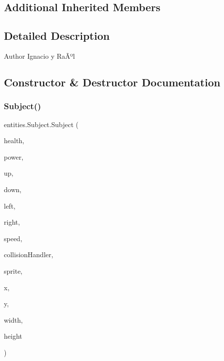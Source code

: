 \subsection*{Additional Inherited Members}


\subsection{Detailed Description}
\begin{DoxyAuthor}{Author}
Ignacio y RaÃºl 
\end{DoxyAuthor}


\subsection{Constructor \& Destructor Documentation}
\mbox{\label{classentities_1_1_subject_aa53c8166a87080bf33996df86431bee2}} 
\subsubsection{\texorpdfstring{Subject()}{Subject()}\hspace{0.1cm}{\footnotesize\ttfamily [1/2]}}
{\footnotesize\ttfamily entities.\+Subject.\+Subject (\begin{DoxyParamCaption}\item[{int}]{health,  }\item[{int}]{power,  }\item[{\mbox{\hyperlink{classorg_1_1newdawn_1_1slick_1_1_animation}{Animation}}}]{up,  }\item[{\mbox{\hyperlink{classorg_1_1newdawn_1_1slick_1_1_animation}{Animation}}}]{down,  }\item[{\mbox{\hyperlink{classorg_1_1newdawn_1_1slick_1_1_animation}{Animation}}}]{left,  }\item[{\mbox{\hyperlink{classorg_1_1newdawn_1_1slick_1_1_animation}{Animation}}}]{right,  }\item[{float}]{speed,  }\item[{\mbox{\hyperlink{classentities_1_1_collision_handler}{Collision\+Handler}}}]{collision\+Handler,  }\item[{\mbox{\hyperlink{classorg_1_1newdawn_1_1slick_1_1_image}{Image}}}]{sprite,  }\item[{float}]{x,  }\item[{float}]{y,  }\item[{float}]{width,  }\item[{float}]{height }\end{DoxyParamCaption})\hspace{0.3cm}{\ttfamily [inline]}}


